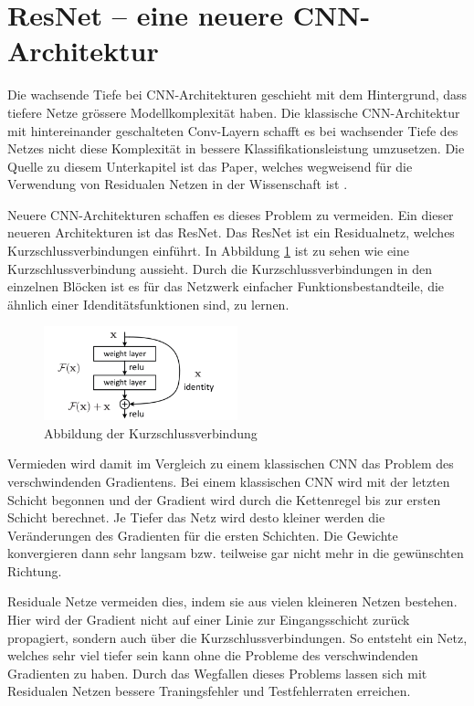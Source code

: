 \section{ResNet -- eine neuere CNN-Architektur}
Die wachsende Tiefe bei CNN-Architekturen geschieht mit dem Hintergrund, dass tiefere Netze grössere Modellkomplexität haben. Die klassische CNN-Architektur mit hintereinander geschalteten Conv-Layern schafft es bei wachsender Tiefe des Netzes nicht diese Komplexität in bessere Klassifikationsleistung umzusetzen. Die Quelle zu diesem Unterkapitel ist das Paper, welches wegweisend für die Verwendung von Residualen Netzen in der Wissenschaft ist \cite{resnet}.


Neuere CNN-Architekturen schaffen es dieses Problem zu vermeiden. Ein dieser neueren Architekturen ist das ResNet. Das ResNet ist ein Residualnetz, welches Kurzschlussverbindungen einführt. In Abbildung \ref{abb:residual} ist zu sehen wie eine Kurzschlussverbindung aussieht. Durch die Kurzschlussverbindungen in den einzelnen Blöcken ist es für das Netzwerk einfacher Funktionsbestandteile, die ähnlich einer Idenditätsfunktionen sind, zu lernen.   

\begin{figure}[h]
 \centering
 \includegraphics[width=0.5\textwidth]{KapitelPartA/images/kurzschluss.png}
 \caption{Abbildung der Kurzschlussverbindung \cite{resnet}}
 \label{abb:residual}
\end{figure}



Vermieden wird damit im Vergleich zu einem klassischen CNN das Problem des verschwindenden Gradientens. Bei einem klassischen CNN wird mit der letzten Schicht begonnen und der Gradient wird durch die Kettenregel bis zur ersten Schicht berechnet. Je Tiefer das Netz wird desto kleiner werden die Veränderungen des Gradienten für die ersten Schichten. Die Gewichte konvergieren dann sehr langsam bzw. teilweise gar nicht mehr in die gewünschten Richtung.


Residuale Netze vermeiden dies, indem sie aus vielen kleineren Netzen bestehen. Hier wird der Gradient nicht auf einer Linie zur Eingangsschicht zurück propagiert, sondern auch über die Kurzschlussverbindungen. So entsteht ein Netz, welches sehr viel tiefer sein kann ohne die Probleme des verschwindenden Gradienten zu haben. Durch das Wegfallen dieses Problems lassen sich mit Residualen Netzen bessere Traningsfehler und Testfehlerraten erreichen.


